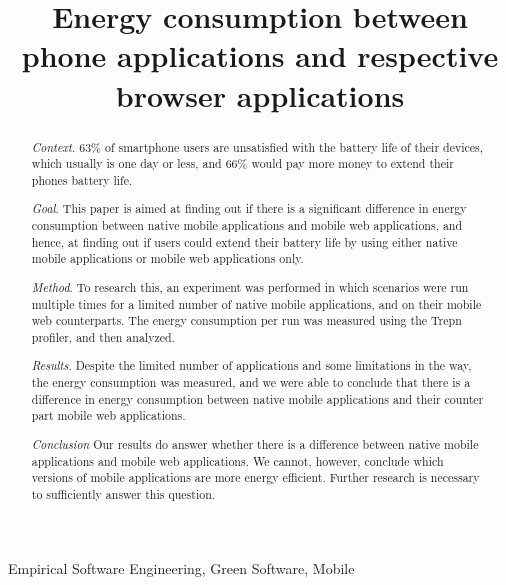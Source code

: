 \documentclass[10pt, conference]{IEEEtran}
\newcommand{\todo}[1]{\textcolor{blue}{\ding{46}~#1}}
\begin{document}
\title{Energy consumption between phone applications and  respective browser applications}

\author{
\and
{}
\and
{}
\and
{}
}

\maketitle

\begin{abstract}
\noindent \textit{Context}. 63\% of smartphone users are unsatisfied with the battery life of their devices, which usually is one day or less, and 66\% would pay more money to extend their phones battery life.

\noindent \textit{Goal}. This paper is aimed at finding out if there is a significant difference in energy consumption between native mobile applications and mobile web applications, and hence, at finding out if users could extend their battery life by using either native mobile applications or mobile web applications only.

\noindent \textit{Method}. To research this, an experiment was performed in which scenarios were run multiple times for a limited number of native mobile applications, and on their mobile web counterparts. The energy consumption per run was measured using the Trepn profiler, and then analyzed.

\noindent \textit{Results}. Despite the limited number of applications and some limitations in the way, the energy consumption was measured, and we were able to conclude that there is a difference in energy consumption between native mobile applications and their counter part mobile web applications. %

\noindent \textit{Conclusion}
Our results do answer whether there is a difference between native mobile applications and mobile web applications. We cannot, however, conclude which versions of mobile applications are more energy efficient. Further research is necessary to sufficiently answer this question.
\end{abstract}

\begin{IEEEkeywords}
Empirical Software Engineering, Green Software, Mobile
\end{IEEEkeywords}



 


 



 
% 
\newpage


\end{document}
